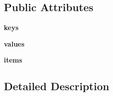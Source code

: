\subsection*{Public Attributes}
\begin{CompactItemize}
\item 
\hypertarget{classPyPedal_1_1odict_1_1SequenceOrderedDict_92fa543790882256dba72fdbbaf59980}{
\textbf{keys}}
\label{classPyPedal_1_1odict_1_1SequenceOrderedDict_92fa543790882256dba72fdbbaf59980}

\item 
\hypertarget{classPyPedal_1_1odict_1_1SequenceOrderedDict_1e3a7c8ba8e70bb5f6be405cd27fa693}{
\textbf{values}}
\label{classPyPedal_1_1odict_1_1SequenceOrderedDict_1e3a7c8ba8e70bb5f6be405cd27fa693}

\item 
\hypertarget{classPyPedal_1_1odict_1_1SequenceOrderedDict_0c8a6aad6ae8b534b3a4a94dde30071a}{
\textbf{items}}
\label{classPyPedal_1_1odict_1_1SequenceOrderedDict_0c8a6aad6ae8b534b3a4a94dde30071a}

\end{CompactItemize}


\subsection{Detailed Description}


